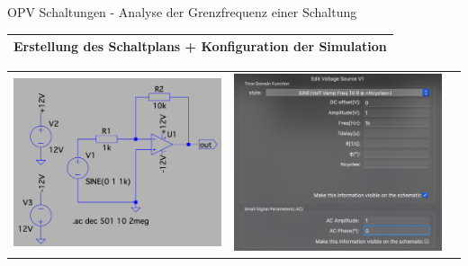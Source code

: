 \begin{frame}[t]{OPV Schaltungen - Analyse der Grenzfrequenz einer Schaltung }
  \begin{spacing}{0.9} \begin{tiny}
      \begin{table}[h!]
        \begin{tabular}{p{10cm}}
          \hline
          \textbf{Erstellung des Schaltplans + Konfiguration der Simulation} \\
          \hline
        \end{tabular}
        \begin{tabular}{p{2cm} p{2cm} p{6cm}}
          \begin{minipage}{.2\textwidth}
            \includegraphics[width=0.8\linewidth]{pictures/opamp_3.png}
          \end{minipage}
           &
          \begin{minipage}{.2\textwidth}
            \includegraphics[width=0.8\linewidth]{pictures/ac_small_signal.png}

\end{minipage}
\end{tabular}
\end{table}
\end{tiny}
\end{spacing}
\end{frame}
